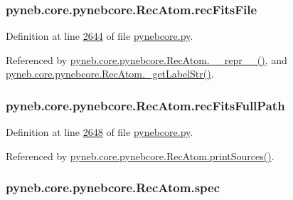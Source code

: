 \subsubsection[{rec\+Fits\+File}]{\setlength{\rightskip}{0pt plus 5cm}pyneb.\+core.\+pynebcore.\+Rec\+Atom.\+rec\+Fits\+File}\label{classpyneb_1_1core_1_1pynebcore_1_1_rec_atom_a2108a27da329b8599357e990a446faae}


Definition at line \hyperlink{pynebcore_8py_source_l02644}{2644} of file \hyperlink{pynebcore_8py_source}{pynebcore.\+py}.



Referenced by \hyperlink{pynebcore_8py_source_l03032}{pyneb.\+core.\+pynebcore.\+Rec\+Atom.\+\_\+\+\_\+repr\+\_\+\+\_\+()}, and \hyperlink{pynebcore_8py_source_l02854}{pyneb.\+core.\+pynebcore.\+Rec\+Atom.\+\_\+get\+Label\+Str()}.

\hypertarget{classpyneb_1_1core_1_1pynebcore_1_1_rec_atom_af74fe68ebe037be119ac2f136485782b}{}
\subsubsection[{rec\+Fits\+Full\+Path}]{\setlength{\rightskip}{0pt plus 5cm}pyneb.\+core.\+pynebcore.\+Rec\+Atom.\+rec\+Fits\+Full\+Path}\label{classpyneb_1_1core_1_1pynebcore_1_1_rec_atom_af74fe68ebe037be119ac2f136485782b}


Definition at line \hyperlink{pynebcore_8py_source_l02648}{2648} of file \hyperlink{pynebcore_8py_source}{pynebcore.\+py}.



Referenced by \hyperlink{pynebcore_8py_source_l02796}{pyneb.\+core.\+pynebcore.\+Rec\+Atom.\+print\+Sources()}.

\hypertarget{classpyneb_1_1core_1_1pynebcore_1_1_rec_atom_ac2485287f7694915959ba49b9b82e483}{}
\subsubsection[{spec}]{\setlength{\rightskip}{0pt plus 5cm}pyneb.\+core.\+pynebcore.\+Rec\+Atom.\+spec}\label{classpyneb_1_1core_1_1pynebcore_1_1_rec_atom_ac2485287f7694915959ba49b9b82e483}


